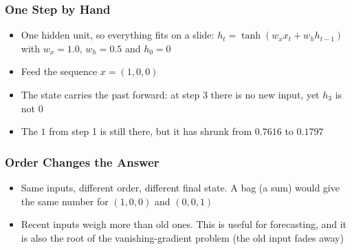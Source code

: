 \begin{frame}[fragile] \frametitle{One Step by Hand}
\begin{itemize}
\item One hidden unit, so everything fits on a slide: $h_t = \tanh(w_x x_t + w_h h_{t-1})$ with $w_x = 1.0$, $w_h = 0.5$ and $h_0 = 0$
\item Feed the sequence $x = (1, 0, 0)$
\end{itemize}
\begin{center}
\small
{}
\end{center}
\begin{itemize}
\item The state carries the past forward: at step 3 there is no new input, yet $h_3$ is not 0
\item The $1$ from step 1 is still there, but it has shrunk from $0.7616$ to $0.1797$
\end{itemize}
\end{frame}

\begin{frame}[fragile] \frametitle{Order Changes the Answer}
\begin{center}
\small
{}
\end{center}
\begin{itemize}
\item Same inputs, different order, different final state. A bag (a sum) would give the same number for $(1,0,0)$ and $(0,0,1)$
\item Recent inputs weigh more than old ones. This is useful for forecasting, and it is also the root of the vanishing-gradient problem (the old input fades away)
\end{itemize}
\end{frame}

